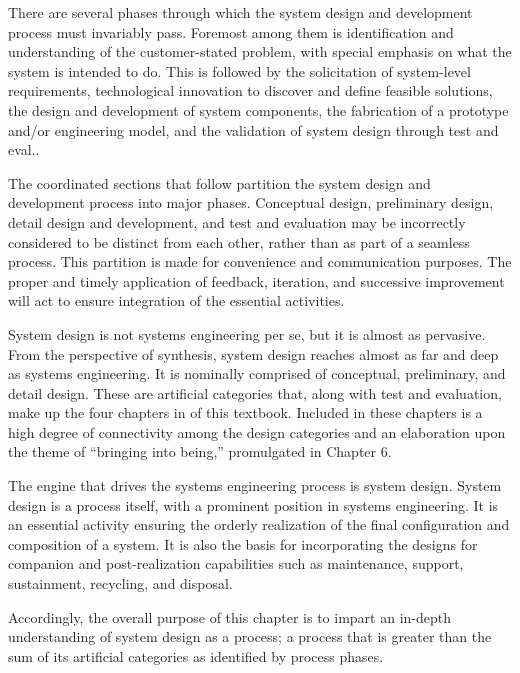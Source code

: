 There are several phases through which the system design and development process must invariably pass. Foremost among them is identification and understanding of the customer-stated problem, with special emphasis on what the system is intended to do. This is followed by the solicitation of system-level requirements, technological innovation to discover and define feasible solutions, the design and development of system components, the fabrication of a prototype and/or engineering model, and the validation of system design through test and eval..

The coordinated sections that follow partition the system design and development process into major phases. Conceptual design, preliminary design, detail design and development, and test and evaluation may be incorrectly considered to be distinct from each other, rather than as part of a seamless process. This partition is made for convenience and communication purposes. The proper and timely application of feedback, iteration, and successive improvement will act to ensure integration of the essential activities.

System design is not systems engineering per se, but it is almost as pervasive. From the perspective of synthesis, system design reaches almost as far and deep as systems engineering. It is nominally comprised of conceptual, preliminary, and detail design. These are artificial categories that, along with test and evaluation, make up the four chapters in of this textbook. Included in these chapters is a high degree of connectivity among the design categories and an elaboration upon the theme of ``bringing into being,'' promulgated in Chapter 6.

The engine that drives the systems engineering process is system design. System design is a process itself, with a prominent position in systems engineering. It is an essential activity ensuring the orderly realization of the final configuration and composition of a system. It is also the basis for incorporating the designs for companion and post-realization capabilities such as maintenance, support, sustainment, recycling, and disposal.

Accordingly, the overall purpose of this chapter is to impart an in-depth understanding of system design as a process; a process that is greater than the sum of its artificial categories as identified by process phases.